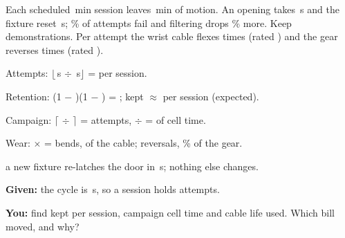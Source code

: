 \documentclass{studysheet}
\begin{document}
\begin{leftcol}
\begin{practicebox}
Each scheduled \,min session leaves \,min of motion. An opening takes \,s and the
fixture reset \,s; \% of attempts fail and filtering drops \% more. Keep
 demonstrations. Per attempt the wrist cable flexes  times (rated ) and the
gear reverses  times (rated ).
\begin{steps}
\item Attempts: $\lfloor$\,s $\div$ \,s$\rfloor$ =  per session.
\item Retention: (1 $-$ )(1 $-$ ) = ; kept $\approx$  per session (expected).
\item Campaign: $\lceil$ $\div$ $\rceil$ =  attempts, $\div$  =
   of cell time.
\item Wear:  $\times$  =  bends,  of the cable;
   reversals, \% of the gear.
\end{steps}
\end{practicebox}

\vspace{10pt}
\begin{practicebox}
\assumed{} a new fixture re-latches the door in \,s; nothing else changes.\par\vspace{4pt}
\textbf{Given:} the cycle is \,s, so a session holds  attempts.\par
\textbf{You:} find kept per session, campaign cell time and cable life used. Which bill moved, and why?\par\vspace{34pt}
\end{practicebox}
\end{leftcol}%
\end{document}
